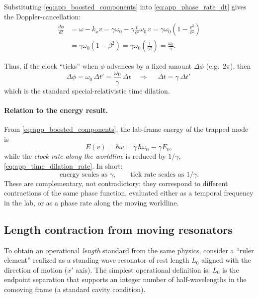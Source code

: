 \documentclass[11pt]{article}
\begin{document}
Substituting \eqref{eq:app_boosted_components} into \eqref{eq:app_phase_rate_dt}
gives the Doppler-cancellation:
\begin{align}
\frac{d\phi}{dt}
&= \omega - k_x v
= \gamma\omega_0 - \gamma\frac{v}{c^2}\omega_0\,v
= \gamma\omega_0\left(1-\frac{v^2}{c^2}\right)
\nonumber\\
&= \gamma\omega_0(1-\beta^2)
= \gamma\omega_0\left(\frac{1}{\gamma^2}\right)
= \frac{\omega_0}{\gamma}.
\label{eq:app_time_dilation_rate}
\end{align}

Thus, if the clock ``ticks'' when $\phi$ advances by a fixed amount
$\Delta\phi$ (e.g.\ $2\pi$), then
\begin{equation}
\Delta\phi = \omega_0\,\Delta t' = \frac{\omega_0}{\gamma}\,\Delta t
\quad\Rightarrow\quad
\boxed{\;\Delta t = \gamma\,\Delta t'\;}
\label{eq:app_time_dilation}
\end{equation}
which is the standard special-relativistic time dilation.

\paragraph{Relation to the energy result.}
From \eqref{eq:app_boosted_components}, the lab-frame energy of the trapped mode
is
\begin{equation}
E(v)=\hbar\omega = \gamma\,\hbar\omega_0 \equiv \gamma E_0,
\label{eq:app_energy_gamma}
\end{equation}
while the \emph{clock rate along the worldline} is reduced by $1/\gamma$,
\eqref{eq:app_time_dilation_rate}. In short:
\begin{equation}
\text{energy scales as }\gamma,
\qquad
\text{tick rate scales as }1/\gamma.
\label{eq:app_energy_vs_tick}
\end{equation}
These are complementary, not contradictory: they correspond to different
contractions of the same phase function, evaluated either as a temporal
frequency in the lab, or as a phase rate along the moving worldline.

\subsection{Length contraction from moving resonators}
\label{app:standing_wave_length_contraction}

To obtain an operational \emph{length} standard from the same physics, consider
a ``ruler element'' realized as a standing-wave resonator of rest length $L_0$
aligned with the direction of motion ($x'$ axis). The simplest operational
definition is: $L_0$ is the endpoint separation that supports an integer number
of half-wavelengths in the comoving frame (a standard cavity condition).
\end{document}
